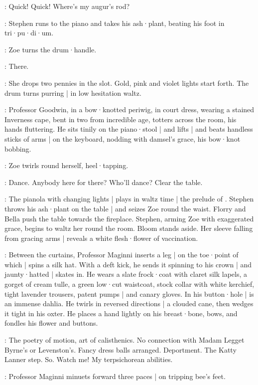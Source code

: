 \Stephen:
Quick!
Quick!
Where's my augur's rod?

:
Stephen runs to the piano and takes his ash·plant,
beating his foot in tri·pu·di·um.

:
Zoe turns the drum·handle.

\Zoe:
There.

:
She drops two pennies in the slot.
Gold,
pink and violet lights start forth.
The drum turns purring |
in low hesitation waltz.

:
Professor Goodwin,
in a bow·knotted periwig,
in court dress,
wearing a stained Inverness cape,
bent in two from incredible age,
totters across the room,
his hands fluttering.
%
He sits tinily on the piano·stool |
and lifts |
and beats handless sticks of arms |
on the keyboard,
nodding with damsel's grace,
his bow·knot bobbing.

:
Zoe twirls round herself,
heel·tapping.

\Zoe:
Dance.
Anybody here for there?
Who'll dance?
Clear the table.

:
The pianola with changing lights |
plays in waltz time |
the prelude of .
Stephen throws his ash·plant on the table |
and seizes Zoe round the waist.
Florry and Bella push the table towards the fireplace.
Stephen,
arming Zoe with exaggerated grace,
begins to waltz her round the room.
Bloom stands aside.
%
Her sleeve falling from gracing arms |
reveals a white flesh·flower of vaccination.

:
Between the curtains,
Professor Maginni inserts a leg |
on the toe·point of which |
spins a silk hat.
With a deft kick,
he sends it spinning to his crown |
and jaunty·hatted |
skates in.
He wears a slate frock·coat with claret silk lapels,
a gorget of cream tulle,
a green low·cut waistcoat,
stock collar with white kerchief,
tight lavender trousers,
patent pumps |
and canary gloves.
In his button·hole |
is an immense dahlia.
He twirls in reversed directions |
a clouded cane,
then wedges it tight in his oxter.
He places a hand lightly on his breast·bone,
%
bows,
and fondles his flower and buttons.

\Maginni[2]:
The poetry of motion,
art of calisthenics.
No connection with Madam Legget Byrne's or Levenston's.
Fancy dress balls arranged.
Deportment.
The Katty Lanner step.
So.
Watch me!
My terpsichorean abilities.

:
Professor Maginni minuets forward three paces |
on tripping bee's feet.

